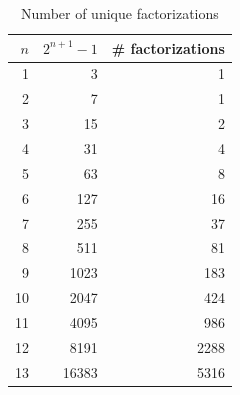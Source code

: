 \documentclass{article}
\begin{document}
    \begin{table}[h!]
            \centering
            \caption{Number of unique factorizations}
            \label{tab:data}    
        \begin{tabular}{|r|r|r|}
            \hline
            $n$ & $2^{n+1}-1$ & \# factorizations \\ \hline
            1 & 3 & 1 \\ \hline 
            2 & 7 & 1 \\ \hline 
            3 & 15 & 2 \\ \hline 
            4 & 31 & 4 \\ \hline 
            5 & 63 & 8 \\ \hline 
            6 & 127 & 16 \\ \hline 
            7 & 255 & 37 \\ \hline 
            8 & 511 & 81 \\ \hline 
            9 & 1023 & 183 \\ \hline 
            10 & 2047 & 424 \\ \hline 
            11 & 4095 & 986 \\ \hline 
            12 & 8191 & 2288 \\ \hline 
            13 & 16383 & 5316 \\ \hline 
        \end{tabular}

    \end{table}
    
\end{document}
